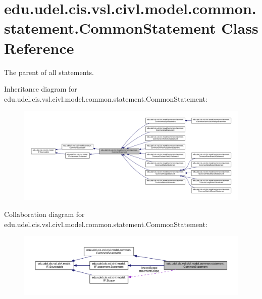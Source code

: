 \hypertarget{classedu_1_1udel_1_1cis_1_1vsl_1_1civl_1_1model_1_1common_1_1statement_1_1CommonStatement}{}\section{edu.\+udel.\+cis.\+vsl.\+civl.\+model.\+common.\+statement.\+Common\+Statement Class Reference}
\label{classedu_1_1udel_1_1cis_1_1vsl_1_1civl_1_1model_1_1common_1_1statement_1_1CommonStatement}


The parent of all statements.  




Inheritance diagram for edu.\+udel.\+cis.\+vsl.\+civl.\+model.\+common.\+statement.\+Common\+Statement\+:
\nopagebreak
\begin{figure}[H]
\begin{center}
\leavevmode
\includegraphics[width=350pt]{classedu_1_1udel_1_1cis_1_1vsl_1_1civl_1_1model_1_1common_1_1statement_1_1CommonStatement__inherit__graph}
\end{center}
\end{figure}


Collaboration diagram for edu.\+udel.\+cis.\+vsl.\+civl.\+model.\+common.\+statement.\+Common\+Statement\+:
\nopagebreak
\begin{figure}[H]
\begin{center}
\leavevmode
\includegraphics[width=350pt]{classedu_1_1udel_1_1cis_1_1vsl_1_1civl_1_1model_1_1common_1_1statement_1_1CommonStatement__coll__graph}
\end{center}
\end{figure}
